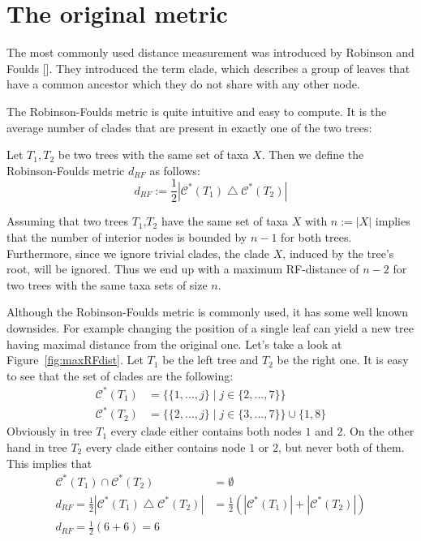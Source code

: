 \section{The original metric}
The most commonly used distance measurement was introduced by Robinson and Foulds []. They introduced the term clade, which describes a group of leaves that have a common ancestor which they do not share with any other node.

The Robinson-Foulds metric is quite intuitive and easy to compute. It is the average number of clades that are present in exactly one of the two trees:
\begin{defin}
Let $T_1,T_2$ be two trees with the same set of taxa $X$. Then we define the Robinson-Foulds metric $d_{RF}$ as follows:
\[ d_{RF} := \frac{1}{2}|\mathcal{C}^*(T_1) \bigtriangleup \mathcal{C}^*(T_2)| \]
\end{defin}
\begin{rem}
Assuming that two trees $T_1$,$T_2$ have the same set of taxa $X$ with $n:= |X|$ implies that the number of interior nodes is bounded by $n-1$ for both trees. Furthermore, since we ignore trivial clades, the clade $X$, induced by the tree's root, will be ignored. Thus we end up with a maximum RF-distance of $n-2$ for two trees with the same taxa sets of size $n$.
\end{rem}
Although the Robinson-Foulds metric is commonly used, it has some well known downsides. For example changing the position of a single leaf can yield a new tree having maximal distance from the original one. Let's take a look at Figure~\ref{fig:maxRFdist}. Let $T_1$ be the left tree and $T_2$ be the right one. It is easy to see that the set of clades are the following:
\begin{align*}
\mathcal{C}^*(T_1) &=\{ \{1,...,j\}\;|\;j\in \{2,...,7\}\} \\
\mathcal{C}^*(T_2) &=\{ \{2,...,j\}\;|\;j\in \{3,...,7\}\} \cup \{1,8\}
\end{align*}
Obviously in tree $T_1$ every clade either contains both nodes $1$ and $2$. On the other hand in tree $T_2$ every clade either contains node $1$ or $2$, but never both of them. This implies that 
\begin{align*}
\mathcal{C}^*(T_1) \cap \mathcal{C}^*(T_2) &= \emptyset \\
d_{RF} = \frac{1}{2}|\mathcal{C}^*(T_1) \bigtriangleup \mathcal{C}^*(T_2)| &= \frac{1}{2}(|\mathcal{C}^*(T_1)| + |\mathcal{C}^*(T_2)|) \\
d_{RF} = \frac{1}{2}(6 + 6) = 6
\end{align*}
